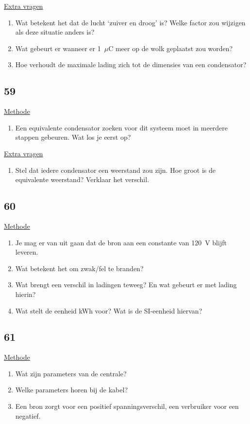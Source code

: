 \underline{Extra vragen}
\begin{enumerate}
	\item Wat betekent het dat de lucht `zuiver en droog' is? Welke factor zou wijzigen als deze situatie anders is?
	\item Wat gebeurt er wanneer er 1~$\mu$C meer op de wolk geplaatst zou worden?
	\item Hoe verhoudt de maximale lading zich tot de dimensies van een condensator?
\end{enumerate}





\subsection*{59}
\underline{Methode}
\begin{enumerate}
	\item Een equivalente condensator zoeken voor dit systeem moet in meerdere stappen gebeuren. Wat los je eerst op?
\end{enumerate}

\underline{Extra vragen}
\begin{enumerate}
	\item Stel dat iedere condensator een weerstand zou zijn. Hoe groot is de equivalente weerstand? Verklaar het verschil.
\end{enumerate}




\subsection*{60}
\underline{Methode}
\begin{enumerate}
	\item Je mag er van uit gaan dat de bron aan een constante van 120~V blijft leveren. 
	\item Wat betekent het om zwak/fel te branden?
	\item Wat brengt een verschil in ladingen teweeg? En wat gebeurt er met lading hierin?
	\item Wat stelt de eenheid kWh voor? Wat is de SI-eenheid hiervan?
\end{enumerate}


\subsection*{61}
\underline{Methode}
\begin{enumerate}
	\item Wat zijn parameters van de centrale?
	\item Welke parameters horen bij de kabel?
	\item Een bron zorgt voor een positief spanningsverschil, een verbruiker voor een negatief.
\end{enumerate}


